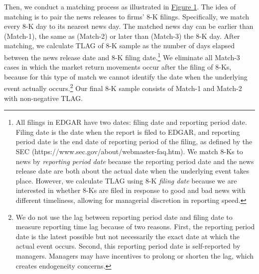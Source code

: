 \documentclass[a4paper]{article}
\begin{document}
\begin{spacing}{2}
Then, we conduct a matching process as illustrated in \hyperref[fig1]{Figure 1}. The idea of matching is to pair the news releases to firms' 8-K filings. Specifically, we match every 8-K day to its nearest news day. The matched news day can be earlier than (Match-1), the same as (Match-2) or later than (Match-3) the 8-K day. After matching, we calculate TLAG of 8-K sample as the number of days elapsed between the news release date and 8-K filing date.\footnote{All filings in EDGAR have two dates: filing date and reporting period date. Filing date is the date when the report is filed to EDGAR, and reporting period date is the end date of reporting period of the filing, as defined by the SEC (https://www.sec.gov/about/webmaster-faq.htm). We match 8-Ks to news by \textit{reporting period date} because the reporting period date and the news release date are both about the actual date when the underlying event takes place. However, we calculate TLAG using 8-K \textit{filing date} because we are interested in whether 8-Ks are filed in response to good and bad news with different timeliness, allowing for managerial discretion in reporting speed.} We eliminate all Match-3 cases in which the market return movements occur after the filing of 8-Ks, because for this type of match we cannot identify the date when the underlying event actually occurs.\footnote{We do not use the lag between reporting period date and filing date to measure reporting time lag because of two reasons. First, the reporting period date is the latest possible but not necessarily the exact date at which the actual event occurs. Second, this reporting period date is self-reported by managers. Managers may have incentives to prolong or shorten the lag, which creates endogeneity concerns.} Our final 8-K sample consists of Match-1 and Match-2 with non-negative TLAG.


\end{spacing}
\end{document}
